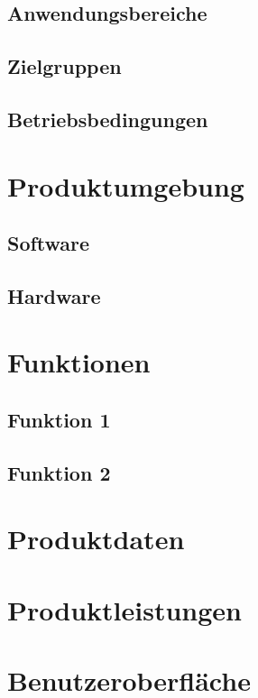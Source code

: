 \documentclass[parskip=full]{scrartcl}
\begin{document}
\subsection{Anwendungsbereiche}
\subsection{Zielgruppen}
\subsection{Betriebsbedingungen}


\section{Produktumgebung}

\subsection{Software}
\subsection{Hardware}


\section{Funktionen}

\subsection{Funktion 1}
\subsection{Funktion 2}

\section{Produktdaten}

\section{Produktleistungen}

\section{Benutzeroberfläche}
\end{document}
